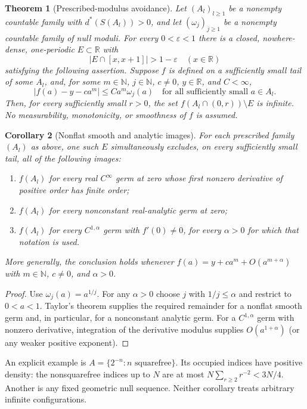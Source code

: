 \documentclass[11pt]{article}
\newtheorem{theorem}{Theorem}[section]
\newtheorem{corollary}[theorem]{Corollary}
\theoremstyle{remark}\newtheorem{remark}[theorem]{Remark}
\newcommand{\R}{\mathbb R}\newcommand{\N}{\mathbb N}\newcommand{\Z}{\mathbb Z}
\begin{document}
\begin{theorem}[Prescribed-modulus avoidance]\label{thm:main}
Let $(A_l)_{l\ge1}$ be a nonempty countable family with $d^*(S(A_l))>0$, and let $(\omega_j)_{j\ge1}$ be a nonempty countable family of null moduli. For every $0<\varepsilon<1$ there is a closed, nowhere-dense, one-periodic $E\subset\R$ with
\[
 |E\cap[x,x+1]|>1-\varepsilon\quad(x\in\R)
\]
satisfying the following assertion. Suppose $f$ is defined on a sufficiently small tail of some $A_l$, and, for some $m\in\N$, $j\in\N$, $c\ne0$, $y\in\R$, and $C<\infty$,
\begin{equation}\label{eq:germ}
 |f(a)-y-ca^m|\le C a^m\omega_j(a)
 \quad\text{for all sufficiently small }a\in A_l.
\end{equation}
Then, for every sufficiently small $r>0$, the set $f(A_l\cap(0,r))\setminus E$ is infinite. No measurability, monotonicity, or smoothness of $f$ is assumed.
\end{theorem}

\begin{corollary}[Nonflat smooth and analytic images]\label{cor:smooth}
For each prescribed family $(A_l)$ as above, one such $E$ simultaneously excludes, on every sufficiently small tail, all of the following images:
\begin{enumerate}
\item $f(A_l)$ for every real $C^\infty$ germ at zero whose first nonzero derivative of positive order has finite order;
\item $f(A_l)$ for every nonconstant real-analytic germ at zero;
\item $f(A_l)$ for every $C^{1,\alpha}$ germ with $f'(0)\ne0$, for every $\alpha>0$ for which that notation is used.
\end{enumerate}
More generally, the conclusion holds whenever
$f(a)=y+ca^m+O(a^{m+\alpha})$ with $m\in\N$, $c\ne0$, and $\alpha>0$.
\end{corollary}
\begin{proof}
Use $\omega_j(a)=a^{1/j}$. For any $\alpha>0$ choose $j$ with $1/j\le\alpha$ and restrict to $0<a<1$. Taylor's theorem supplies the required remainder for a nonflat smooth germ and, in particular, for a nonconstant analytic germ. For a $C^{1,\alpha}$ germ with nonzero derivative, integration of the derivative modulus supplies $O(a^{1+\alpha})$ (or any weaker positive exponent).
\end{proof}

An explicit example is $A=\{2^{-n}:n\text{ squarefree}\}$. Its occupied indices have positive density: the nonsquarefree indices up to $N$ are at most
$N\sum_{r\ge2}r^{-2}<3N/4$. Another is any fixed geometric null sequence. Neither corollary treats arbitrary infinite configurations.
\end{document}
